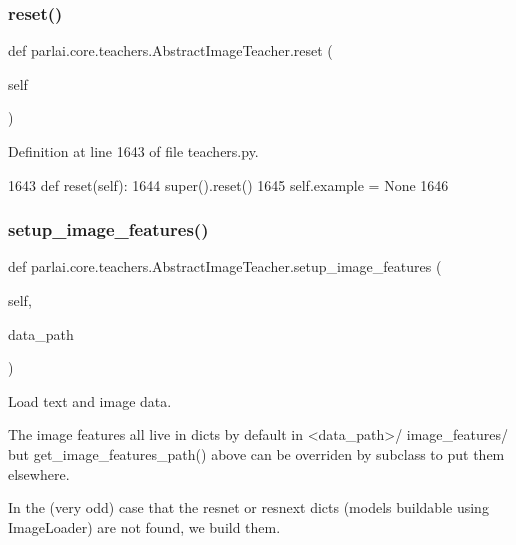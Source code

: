 \subsubsection{\texorpdfstring{reset()}{reset()}}
{\footnotesize\ttfamily def parlai.\+core.\+teachers.\+Abstract\+Image\+Teacher.\+reset (\begin{DoxyParamCaption}\item[{}]{self }\end{DoxyParamCaption})}



Definition at line 1643 of file teachers.\+py.


\begin{DoxyCode}
1643     \textcolor{keyword}{def }reset(self):
1644         super().reset()
1645         self.example = \textcolor{keywordtype}{None}
1646 
\end{DoxyCode}
\mbox{\label{classparlai_1_1core_1_1teachers_1_1AbstractImageTeacher_aa6ac386d509d428870124c27265363bb}} 
\subsubsection{\texorpdfstring{setup\+\_\+image\+\_\+features()}{setup\_image\_features()}}
{\footnotesize\ttfamily def parlai.\+core.\+teachers.\+Abstract\+Image\+Teacher.\+setup\+\_\+image\+\_\+features (\begin{DoxyParamCaption}\item[{}]{self,  }\item[{}]{data\+\_\+path }\end{DoxyParamCaption})}

\begin{DoxyVerb}Load text and image data.

The image features all live in dicts by default in <data_path>/
image_features/ but get_image_features_path() above can be overriden by
subclass to put them elsewhere.

In the (very odd) case that the resnet or resnext dicts (models
buildable using ImageLoader) are not found, we build them.
\end{DoxyVerb}
 

